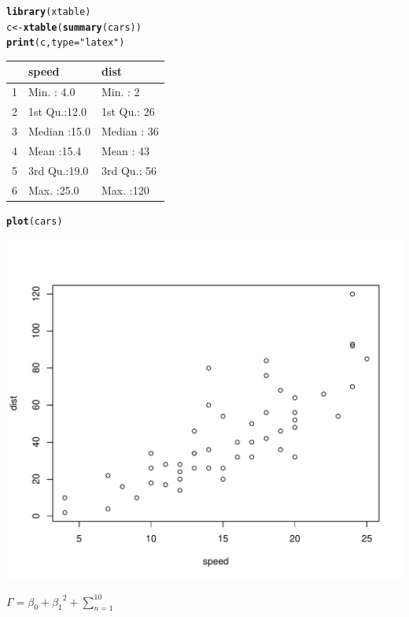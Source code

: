 \documentclass{article}\usepackage[]{graphicx}\usepackage[]{color}
\makeatletter
\def\maxwidth{ %
  \ifdim\Gin@nat@width>\linewidth
    \linewidth
  \else
    \Gin@nat@width
  \fi
}
\newcommand{\hlstr}[1]{\textcolor[rgb]{0.192,0.494,0.8}{#1}}%
\newcommand{\hlstd}[1]{\textcolor[rgb]{0.345,0.345,0.345}{#1}}%
\newcommand{\hlkwb}[1]{\textcolor[rgb]{0.69,0.353,0.396}{#1}}%
\newcommand{\hlkwc}[1]{\textcolor[rgb]{0.333,0.667,0.333}{#1}}%
\newcommand{\hlkwd}[1]{\textcolor[rgb]{0.737,0.353,0.396}{\textbf{#1}}}%
\newenvironment{kframe}{%
 \def\at@end@of@kframe{}%
 \ifinner\ifhmode%
  \def\at@end@of@kframe{\end{minipage}}%
  \begin{minipage}{\columnwidth}%
 \fi\fi%
 \def\FrameCommand##1{\hskip\@totalleftmargin \hskip-\fboxsep
 \colorbox{shadecolor}{##1}\hskip-\fboxsep
     \hskip-\linewidth \hskip-\@totalleftmargin \hskip\columnwidth}%
 \MakeFramed {\advance\hsize-\width
   \@totalleftmargin\z@ \linewidth\hsize
   \@setminipage}}%
 {\par\unskip\endMakeFramed%
 \at@end@of@kframe}
\makeatother
\begin{document}
\begin{kframe}
\begin{alltt}
\hlkwd{library}\hlstd{(xtable)}
\hlstd{c} \hlkwb{<-} \hlkwd{xtable}\hlstd{(}\hlkwd{summary}\hlstd{(cars))}
\hlkwd{print}\hlstd{(c,} \hlkwc{type} \hlstd{=} \hlstr{"latex"}\hlstd{)}
\end{alltt}
\end{kframe}%
\begin{table}[ht]
\centering
\begin{tabular}{rll}
  \hline
 &     speed &      dist \\ 
  \hline
1 & Min.   : 4.0   & Min.   :  2   \\ 
  2 & 1st Qu.:12.0   & 1st Qu.: 26   \\ 
  3 & Median :15.0   & Median : 36   \\ 
  4 & Mean   :15.4   & Mean   : 43   \\ 
  5 & 3rd Qu.:19.0   & 3rd Qu.: 56   \\ 
  6 & Max.   :25.0   & Max.   :120   \\ 
   \hline
\end{tabular}
\end{table}
\begin{kframe}\begin{alltt}
\hlkwd{plot}\hlstd{(cars)}
\end{alltt}
\end{kframe}
\includegraphics[width=\maxwidth]{figure/example} 



\centering
$\Gamma = \beta_0 + {\beta_1}^2 + \sum_{n=1}^{10}$
\end{document}
